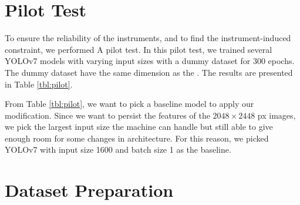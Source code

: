 \section{Pilot Test}
To ensure the reliability of the instruments, and to find the instrument-induced constraint, we performed A
pilot test.
In this pilot test, we trained several YOLOv7 models with varying input sizes with a dummy dataset for 300 epochs.
The dummy dataset have the same dimension as the \textcite{aot_dataset}.
The results are presented in Table \ref{tbl:pilot}. 
\begin{table}[H]
  \centering
  \label{tbl:pilot}
  \vspace{-1ex}
  \begin{adjustbox}{width=\textwidth}
    
  \end{adjustbox}
\end{table}

From Table \ref{tbl:pilot}, we want to pick a baseline model to apply our modification.
Since we want to persist the features of the $2048\times 2448$ px images, we pick the 
largest input size the machine can handle but still able to give enough room for some 
changes in architecture. For this reason, we picked YOLOv7 with input size 1600 and batch size 1
as the baseline.

\section{Dataset Preparation}
\label{section:dataset}

